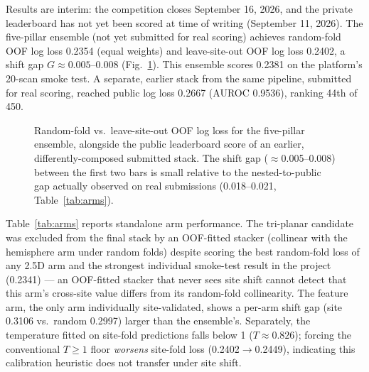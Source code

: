 \documentclass{article}
\newcommand{\shiftgap}{\ensuremath{G}}
\begin{document}
Results are interim: the competition closes September 16, 2026, and the private leaderboard has not yet been scored at time of writing (September 11, 2026). The five-pillar ensemble (not yet submitted for real scoring) achieves random-fold OOF log loss 0.2354 (equal weights) and leave-site-out OOF log loss 0.2402, a shift gap $\shiftgap \approx 0.005$--$0.008$ (Fig.~\ref{fig:shiftgap}). This ensemble scores 0.2381 on the platform's 20-scan smoke test. A separate, earlier stack from the same pipeline, submitted for real scoring, reached public log loss 0.2667 (AUROC 0.9536), ranking 44th of 450.

\begin{figure}[t]
\centering
{}
\caption{Random-fold vs.\ leave-site-out OOF log loss for the five-pillar ensemble, alongside the public leaderboard score of an earlier, differently-composed submitted stack. The shift gap ($\approx$0.005--0.008) between the first two bars is small relative to the nested-to-public gap actually observed on real submissions (0.018--0.021, Table~\ref{tab:arms}).}
\label{fig:shiftgap}
\end{figure}

Table~\ref{tab:arms} reports standalone arm performance. The tri-planar candidate was excluded from the final stack by an OOF-fitted stacker (collinear with the hemisphere arm under random folds) despite scoring the best random-fold loss of any 2.5D arm and the strongest individual smoke-test result in the project (0.2341) --- an OOF-fitted stacker that never sees site shift cannot detect that this arm's cross-site value differs from its random-fold collinearity. The feature arm, the only arm individually site-validated, shows a per-arm shift gap (site 0.3106 vs.\ random 0.2997) larger than the ensemble's. Separately, the temperature fitted on site-fold predictions falls below 1 ($T\approx0.826$); forcing the conventional $T \geq 1$ floor \emph{worsens} site-fold loss (0.2402$\to$0.2449), indicating this calibration heuristic does not transfer under site shift.
\end{document}
